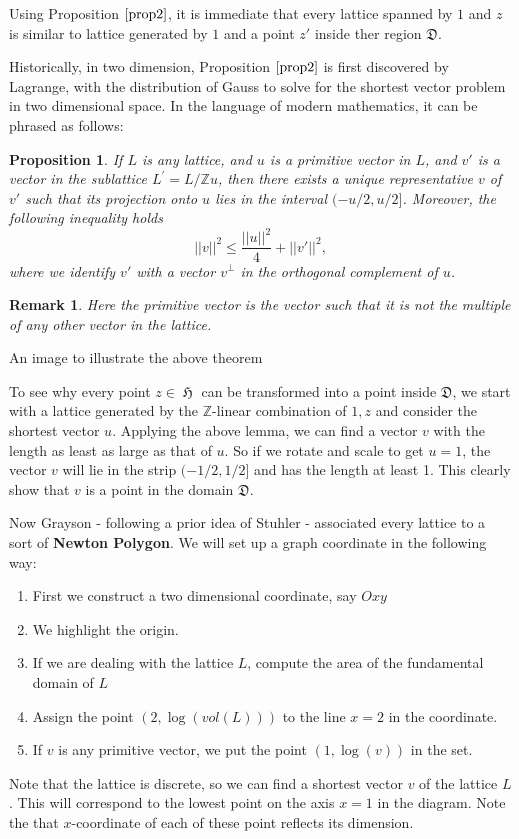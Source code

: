 \documentclass[12pt]{article} %
\newtheorem{prop}[definition]{Proposition}
\newtheorem*{remark}{Remark}
\DeclareMathOperator{\uH}{\mathfrak{H}}
\begin{document}
Using Proposition $\ref{prop2}$, it is immediate that every lattice spanned by $1$ and $z$
is similar to lattice generated by $1$ and a point $z'$ inside ther region $\mathfrak{D}$.

Historically, in two dimension, Proposition $\ref{prop2}$ is first discovered by Lagrange, with the distribution
of Gauss to solve for the shortest vector problem in two dimensional space. In the language of modern mathematics,
it can be phrased as follows:
\begin{prop}
  If $L$ is any lattice, and $u$ is a primitive vector in $L$, and $v'$ is a vector in the sublattice
  $L^\prime = L/\mathbb{Z}u$, then there exists a unique representative $v$ of $v'$ such that its projection onto $u$ lies in the interval
  $(-u/2,u/2]$. Moreover, the following inequality holds
  \[||v||^2 \le \dfrac{||u||^2}{4}+||v'||^2,\]
  where we identify $v'$ with a vector $v^\perp$ in the orthogonal complement of $u$.
\end{prop}
\begin{remark}
  Here the primitive vector is the vector such that it is not the multiple of any other vector in the lattice.
\end{remark}
An image to illustrate the above theorem 

To see why every point $z \in \uH$ can be transformed into a point inside $\mathfrak{D}$,
we start with a lattice generated by the $\mathbb{Z}$-linear combination of $1,z$ and
consider the shortest vector $u$. Applying the above lemma, we can find a vector $v$ with the length as least
as large as that of $u$. So if we rotate and scale to get $u=1$, the vector $v$ will lie
in the strip $(-1/2,1/2]$ and has the length at least 1. This clearly show that $v$ is a point in the domain
$\mathfrak{D}$.


\vspace{\baselineskip}
Now Grayson - following a prior idea of Stuhler - associated every lattice to a sort of \textbf{Newton Polygon}.
We will set up a graph coordinate in the following way:
\begin{enumerate}
  \item First we construct a two dimensional coordinate, say $Oxy$
  \item We highlight the origin.
  \item If we are dealing with the lattice $L$, compute the area of the fundamental domain of $L$
  \item Assign the point $(2, \log(vol(L)))$ to the line $x=2$ in the coordinate.
  \item If $v$ is any primitive vector, we put the point $(1,\log(v))$ in the set.
\end{enumerate}
Note that the lattice is discrete, so we can find a shortest vector $v$ of the lattice $L$. This will
correspond to the lowest point on the axis $x=1$ in the diagram. Note the that $x$-coordinate
of each of these point reflects its dimension.
\end{document}
